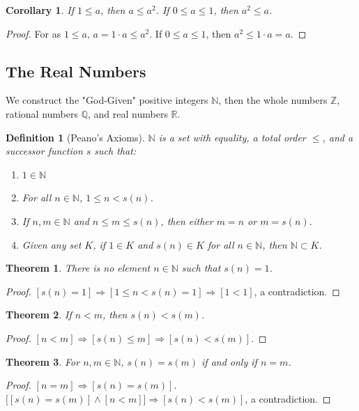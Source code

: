 \documentclass[12pt,oneside]{book}
\theoremstyle{mystyle}
\newtheorem{theorem}{Theorem}[section]
\newtheorem{definition}{Definition}[section]
\newtheorem{corollary}{Corollary}[section]
\begin{document}
\begin{corollary}
If $1\leq a$, then $a \leq a^2$. If $0\leq a \leq 1$, then $a^2 \leq a$.
\end{corollary}
\begin{proof}
For as $1\leq a$, $a=1\cdot a \leq a^2$. If $0\leq a \leq 1$, then $a^2 \leq 1\cdot a = a$.
\end{proof}
%
\subsection{The Real Numbers}
%
We construct the "God-Given" positive integers $\mathbb{N}$, then the whole numbers $\mathbb{Z}$, rational numbers $\mathbb{Q}$, and real numbers $\mathbb{R}$.

\begin{definition}[Peano's Axioms]
$\mathbb{N}$ is a set with equality, a total order $\leq$, and a successor function $s$ such that:
\begin{enumerate}
\item $1\in \mathbb{N}$
\item For all $n\in \mathbb{N}$, $1\leq n < s(n)$.
\item If $n,m\in \mathbb{N}$ and $n\leq m \leq s(n)$, then either $m=n$ or $m=s(n)$.
\item Given any set $K$, if $1\in K$ and $s(n)\in K$ for all $n\in \mathbb{N}$, then $\mathbb{N}\subset K$.
\end{enumerate}
\end{definition}

\begin{theorem}
There is no element $n\in \mathbb{N}$ such that $s(n) =1$.
\end{theorem}
\begin{proof}
$[s(n) = 1]\Rightarrow [1\leq n < s(n)=1]\Rightarrow[1<1]$, a contradiction.
\end{proof}

\begin{theorem}
If $n<m$, then $s(n)< s(m)$.
\end{theorem}
\begin{proof}
$[n<m]\Rightarrow [s(n)\leq m] \Rightarrow [s(n) < s(m)]$.
\end{proof}

\begin{theorem}
For $n,m\in \mathbb{N}$, $s(n)=s(m)$ if and only if $n=m$.
\end{theorem}
\begin{proof}
$[n=m]\Rightarrow [s(n)=s(m)]$. $\big[[s(n)=s(m)]\land [n<m]\big] \Rightarrow [s(n)<s(m)]$, a contradiction.
\end{proof}
\end{document}
